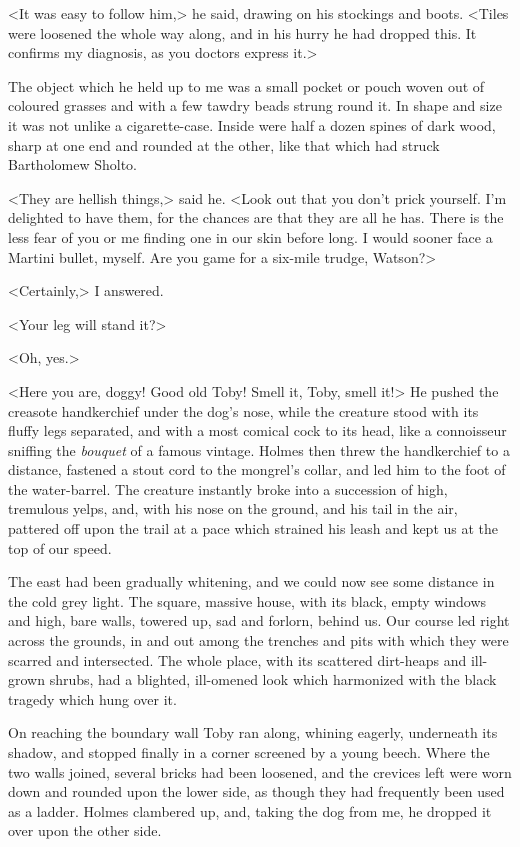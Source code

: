 <It was easy to follow him,> he said, drawing on his stockings and boots. <Tiles were loosened the whole way along, and in his hurry he had dropped this. It confirms my diagnosis, as you doctors express it.>

The object which he held up to me was a small pocket or pouch woven out of coloured grasses and with a few tawdry beads strung round it. In shape and size it was not unlike a cigarette-case. Inside were half a dozen spines of dark wood, sharp at one end and rounded at the other, like that which had struck Bartholomew Sholto.

<They are hellish things,> said he. <Look out that you don't prick yourself. I'm delighted to have them, for the chances are that they are all he has. There is the less fear of you or me finding one in our skin before long. I would sooner face a Martini bullet, myself. Are you game for a six-mile trudge, Watson?>

<Certainly,> I answered.

<Your leg will stand it?>

<Oh, yes.>

<Here you are, doggy! Good old Toby! Smell it, Toby, smell it!> He pushed the creasote handkerchief under the dog's nose, while the creature stood with its fluffy legs separated, and with a most comical cock to its head, like a connoisseur sniffing the \textit{bouquet} of a famous vintage. Holmes then threw the handkerchief to a distance, fastened a stout cord to the mongrel's collar, and led him to the foot of the water-barrel. The creature instantly broke into a succession of high, tremulous yelps, and, with his nose on the ground, and his tail in the air, pattered off upon the trail at a pace which strained his leash and kept us at the top of our speed.

The east had been gradually whitening, and we could now see some distance in the cold grey light. The square, massive house, with its black, empty windows and high, bare walls, towered up, sad and forlorn, behind us. Our course led right across the grounds, in and out among the trenches and pits with which they were scarred and intersected. The whole place, with its scattered dirt-heaps and ill-grown shrubs, had a blighted, ill-omened look which harmonized with the black tragedy which hung over it.

On reaching the boundary wall Toby ran along, whining eagerly, underneath its shadow, and stopped finally in a corner screened by a young beech. Where the two walls joined, several bricks had been loosened, and the crevices left were worn down and rounded upon the lower side, as though they had frequently been used as a ladder. Holmes clambered up, and, taking the dog from me, he dropped it over upon the other side.

